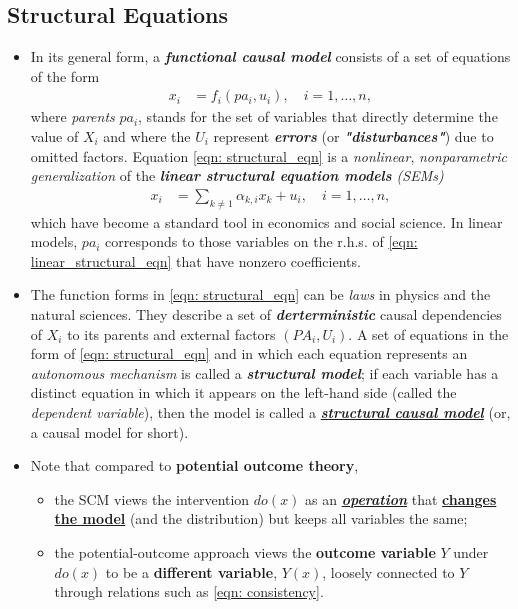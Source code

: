 \documentclass[11pt]{article}
\begin{document}
\subsection{Structural Equations}
\begin{itemize}
\item In its general form, a \emph{\textbf{functional causal model}} consists of a set of equations of the form
\begin{align}
x_i &=  f_i (pa_i, u_i), \quad i = 1, \ldots, n, \label{eqn: structural_eqn}
\end{align}
where  \emph{parents} $pa_i$, stands for the set of variables that directly determine the value of $X_i$ and where the $U_i$ represent \emph{\textbf{errors}} (or \emph{\textbf{"disturbances"}}) due to omitted factors. Equation \eqref{eqn: structural_eqn} is a \emph{nonlinear}, \emph{nonparametric generalization} of the \emph{\textbf{linear structural equation models} (SEMs)}
\begin{align}
x_i &=  \sum_{k\neq 1}\alpha_{k,i} x_{k}   + u_i, \quad i = 1, \ldots, n, \label{eqn: linear_structural_eqn}
\end{align}
which have become a standard tool in economics and social science. In linear models, $pa_i$ corresponds to those variables on the r.h.s. of \eqref{eqn: linear_structural_eqn} that have nonzero coefficients. 

\item The function forms in \eqref{eqn: structural_eqn} can be \emph{laws} in physics and the natural sciences. They describe a set of \emph{\textbf{derterministic}} causal dependencies of $X_i$ to its parents and external factors $(PA_i, U_i)$. A set of equations in the form of  \eqref{eqn: structural_eqn} and in
which each equation represents an \emph{autonomous mechanism} is called a \emph{\textbf{structural model}}; if each variable has a distinct equation in which it appears on the left-hand side (called the \emph{dependent variable}), then the model is called a \underline{\emph{\textbf{structural causal model}}} (or, a causal model for short).

\item Note that compared to \textbf{potential outcome theory},
\begin{itemize}
\item the SCM views the intervention $do(x)$ as an \underline{\emph{\textbf{operation}}} that \underline{\textbf{changes the model}} (and the distribution) but keeps all variables the same;

\item the potential-outcome approach views the \textbf{outcome variable} $Y$ under $do(x)$ to be a \textbf{different variable}, $Y(x)$, loosely connected to $Y$ through relations such as \eqref{eqn: consistency}. 
\end{itemize}
\end{itemize}
\end{document}
